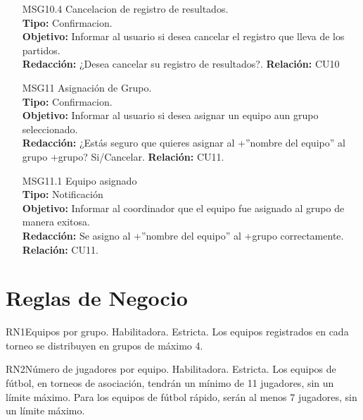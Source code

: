 \begin{itemize}
	 \item[MSG10.4] Cancelacion de registro de resultados.\\
	 \textbf{Tipo:} Confirmacion.\\
	 \textbf{Objetivo:} Informar al usuario si desea cancelar el registro que lleva de los partidos.\\
	 \textbf{Redacción:} ¿Desea cancelar su registro de resultados?.
	 \textbf{Relación:} CU10
	 
	  \item[MSG11] Asignación de Grupo.\\
	 \textbf{Tipo:} Confirmacion.\\
	 \textbf{Objetivo:} Informar al usuario si desea asignar un equipo aun grupo seleccionado.\\
	 \textbf{Redacción:} ¿Estás seguro que quieres asignar al +”nombre del equipo” al grupo +grupo? Si/Cancelar.
	 \textbf{Relación:} CU11.
	 
	  \item[MSG11.1] Equipo asignado\\
	 \textbf{Tipo:} Notificación\\
	 \textbf{Objetivo:} Informar al coordinador que el equipo fue asignado al grupo de manera exitosa.\\
	 \textbf{Redacción:} Se asigno al +”nombre del equipo”  al +grupo correctamente.
	 \textbf{Relación:} CU11.
\end{itemize}

\section{Reglas de Negocio}

\begin{BussinesRule}{RN1}{Equipos por grupo.}
	\BRitem[Tipo:] Habilitadora.
	\BRitem[Nivel:] Estricta.
	\BRitem[Descripción:] Los equipos registrados en cada torneo se distribuyen en grupos de máximo 4.
\end{BussinesRule}

\begin{BussinesRule}{RN2}{Número de jugadores por equipo.} 
	\BRitem[Tipo:] Habilitadora.
	\BRitem[Nivel:] Estricta.
	\BRitem[Descripción:] Los equipos de fútbol, en torneos de asociación, tendrán un mínimo de 11 jugadores, sin un límite máximo.
	Para los equipos de fútbol rápido, serán al menos 7 jugadores, sin un límite máximo.
\end{BussinesRule}

